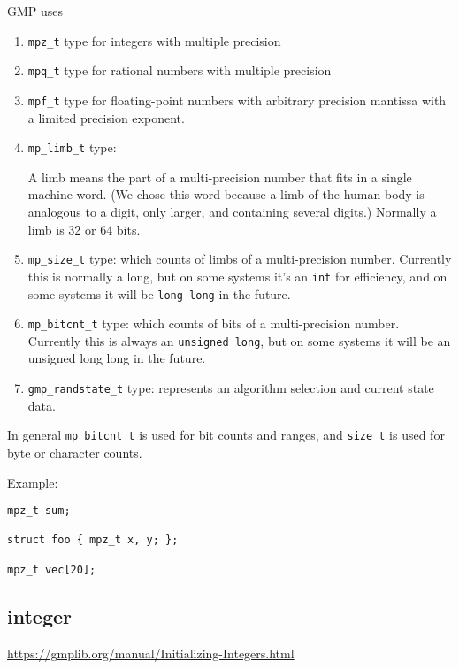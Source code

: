 GMP uses 
\begin{enumerate}
  \item \verb!mpz_t! type for integers with multiple precision
  
  \item \verb!mpq_t! type for rational numbers with multiple precision
  
  \item \verb!mpf_t! type for floating-point numbers with arbitrary precision
  mantissa with a limited precision exponent. 
  
  
  \item \verb!mp_limb_t! type:
  
  A limb means the part of a multi-precision number that fits in a single
  machine word. (We chose this word because a limb of the human body is
  analogous to a digit, only larger, and containing several digits.) Normally a
  limb is 32 or 64 bits. 

  \item \verb!mp_size_t! type: which counts of limbs of a multi-precision
  number. Currently this is normally a long, but on some systems it's an
  \verb!int! for efficiency, and on some systems it will be \verb!long long! in
  the future.
  
  \item \verb!mp_bitcnt_t! type: which counts of bits of a multi-precision
  number. Currently this is always an \verb!unsigned long!, but on some systems
  it will be an unsigned long long in the future.
  
  \item \verb!gmp_randstate_t! type: represents an algorithm selection and
  current state data.
  
  
\end{enumerate}
In general \verb!mp_bitcnt_t! is used for bit counts and ranges, and
\verb!size_t! is used for byte or character counts.

Example:
\begin{verbatim}
mpz_t sum;

struct foo { mpz_t x, y; };

mpz_t vec[20];
\end{verbatim}


\subsection{integer}

\url{https://gmplib.org/manual/Initializing-Integers.html}


